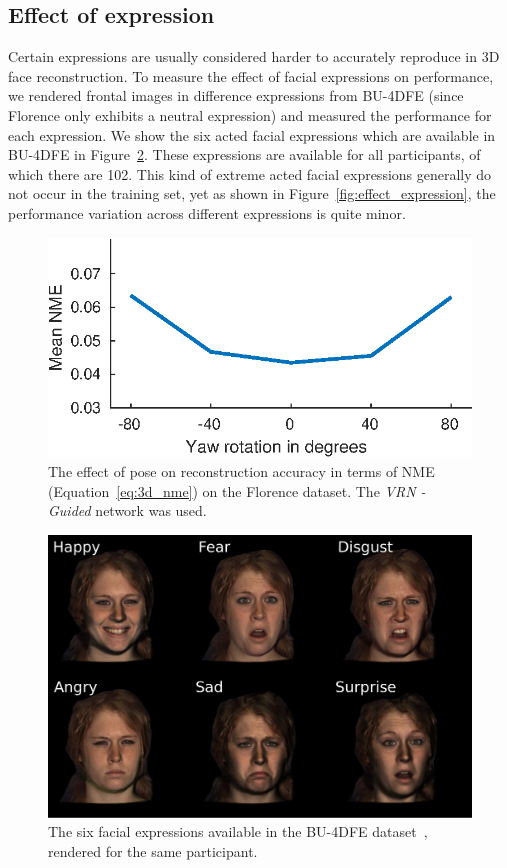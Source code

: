 \subsection{Effect of expression} Certain expressions are usually
considered harder to accurately reproduce in 3D face reconstruction.
To measure the effect of facial expressions on performance, we
rendered frontal images in difference expressions from BU-4DFE (since
Florence only exhibits a neutral expression) and measured the
performance for each expression. We show the six acted facial
expressions which are available in BU-4DFE in
Figure~\ref{fig:bu4dfe_expressions}. These expressions are available
for all participants, of which there are 102. This kind of extreme
acted facial expressions generally do not occur in the training set,
yet as shown in Figure~\ref{fig:effect_expression}, the performance
variation across different expressions is quite minor.

\begin{figure}
  \centering
  \includegraphics[width=0.6\linewidth]{curves/ablation_pose.eps}
  \caption[Effect of pose]{The effect of pose on reconstruction
    accuracy in terms of NME (Equation~\ref{eq:3d_nme}) on the
    Florence dataset. The \textit{VRN - Guided} network was used.}
  \label{fig:effect_pose}
\end{figure}

\begin{figure}
  \centering
  \includegraphics[width=0.8\linewidth]{img/bu4dfe_expressions.pdf}
  \caption[The six facial expressions available in the BU-4DFE
  dataset]{The six facial expressions available in the BU-4DFE
    dataset~\cite{yin2008high}, rendered for the same participant.}
  \label{fig:bu4dfe_expressions}
\end{figure}

